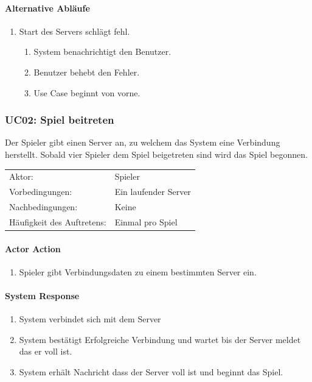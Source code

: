 \documentclass[a4paper,12pt,halfparskip,DIV14]{scrartcl}
\begin{document}
\paragraph{Alternative Abläufe}
\begin{enumerate}
	\item[2a] Start des Servers schlägt fehl.
	\begin{enumerate}
		\item System benachrichtigt den Benutzer.
		\item Benutzer behebt den Fehler.
		\item Use Case beginnt von vorne.
	\end{enumerate}
\end{enumerate}

\subsubsection{UC02: Spiel beitreten}\label{ssub:uc02_spiel_beitreten}
Der Spieler gibt einen Server an, zu welchem das System  eine Verbindung herstellt. Sobald vier Spieler dem Spiel beigetreten sind wird das Spiel begonnen.

\begin{tabular}{@{} l l @{}}
	Aktor:       								&	Spieler \\
	Vorbedingungen:							& Ein laufender Server \\
	Nachbedingungen:						& Keine \\
	Häufigkeit des Auftretens:	& Einmal pro Spiel \\
\end{tabular}

\vspace{0.5cm}

\begin{multicols}{2}
\raggedcolumns
\paragraph{Actor Action}
\begin{enumerate}
	\item[1] Spieler gibt Verbindungsdaten zu einem bestimmten Server ein.
\end{enumerate}
\columnbreak
\paragraph{System Response}
\begin{enumerate}
	\item[2] System verbindet sich mit dem Server
	\item[3] System bestätigt Erfolgreiche Verbindung und wartet bis der Server meldet das er voll ist.
	\item[4] System erhält Nachricht dass der Server voll ist und beginnt das Spiel.
\end{enumerate}
\end{multicols}
\end{document}
